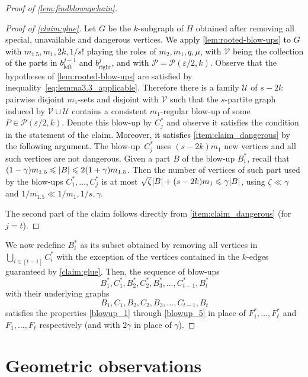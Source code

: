 \documentclass[12pt,reqno]{amsart}
\theoremstyle{plain}
\theoremstyle{definition}
\numberwithin{equation}{section}
\newcommand{\fw}[1]{\textcolor{black}{#1}}
\DeclarePairedDelimiter{\abs}{\lvert}{\rvert}
\renewcommand{\le}{\leqslant}
\newcommand{\eps}{\varepsilon}
\newcommand{\cP}{\mathcal{P}}
\newcommand{\cU}{\mathcal{U}}
\newcommand{\cV}{\mathcal{V}}
\begin{document}
\begin{proof}[Proof of \cref{lem:findblowupchain}]
\begin{proof}[Proof of \cref{claim:glue}]
			Let $G$ be the $k$-subgraph of $H$ obtained after removing all special, unavailable and dangerous vertices.
			\fw{We apply \cref{lem:rooted-blow-ups} to $G$ with $m_{1.5}, m_1, 2k, 1/s!$ playing the roles of $m_2,m_1, q, \mu$, with $\mathcal{V}$ being the collection of the parts in $b^{j-1}_{\text{left}}$ and $b^{j}_{\text{right}}$, and with $\cP=\cP(\eps/2,k)$.} Observe that the hypotheses of \cref{lem:rooted-blow-ups} are satisfied by inequality~\eqref{eq:lemma3.3_applicable}.
			Therefore there is a family $\cU$ of $s-2k$ pairwise disjoint $m_1$-sets and disjoint with $\cV$ such that the $s$-partite graph induced by $\cV \cup \cU$ contains a consistent $m_1$-regular blow-up of some $P \in \cP(\eps/2,k)$.
			Denote this blow-up by $C_j^\ast$ and observe it satisfies the condition in the statement of the claim.
			\fw{Moreover, it satisfies \ref{item:claim_dangerous} by the following argument.}
			The blow-up~$C_j^\ast$ uses $(s-2k) m_1$ new vertices and all such vertices are not dangerous.
			Given a part $B$ of the blow-up $B_i^\ast$, recall that $(1-\gamma)m_{1.5} \le \abs{B} \le 2(1+\gamma)m_{1.5}$.
			Then the number of vertices of such part used by the blow-ups $C_1^\ast, \dots, C_{j}^\ast$ is at most $\sqrt{\zeta}\abs{B}+(s-2k)m_1 \le \gamma \abs{B}$, using $\zeta \ll \gamma$ and $1/m_{1.5} \ll 1/m_1, 1/s, \gamma$.
			
			The second part of the claim follows directly from \ref{item:claim_dangerous} (for $j=t$).
		\end{proof}
		
		We now redefine $B_i^\ast$ as its subset obtained by removing all vertices in $\bigcup_{i \in [t-1]} C_i^\ast$ with the exception of the vertices contained in the $k$-edges guaranteed by \cref{claim:glue}. Then, the sequence of blow-ups
		\begin{equation*}
			B_1^\ast, C_1^\ast, B_2^\ast,C_2^\ast, B_3^\ast,\dotsc, C_{t-1}^\ast, B^\ast_{t}
		\end{equation*}
		with their underlying graphs
		\begin{equation*}
			B_1, C_1, B_2, C_2, B_3, \dotsc, C_{t-1}, B_t
		\end{equation*}
		satisfies the properties \ref{blowup_1} through \ref{blowup_5} in place of $F_1^\ast, \dotsc, F^\ast_\ell$ and $F_1, \dotsc, F_\ell$ respectively (and with $2\gamma$ in place of $\gamma$).
	\end{proof}
	
	
	\section{Geometric observations}
	\label{sec:geometric_obs}
	
\end{document}
